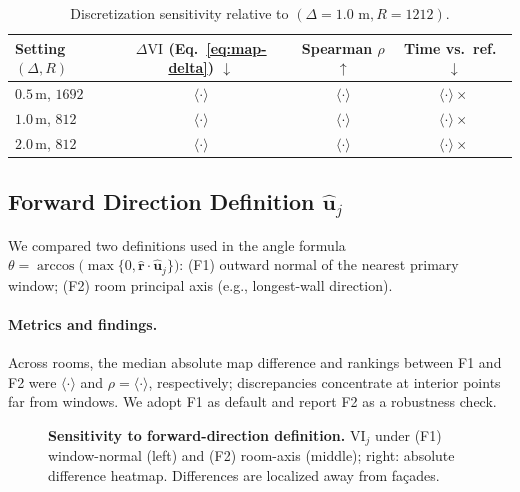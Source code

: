 \documentclass[final,3p,times,review]{elsarticle}
\begin{document}
\begin{table}[H]
\centering
\caption{Discretization sensitivity relative to $(\Delta{=}1.0\text{ m}, R{=}1212)$.}
\label{tab:discretization}
\begin{tabular}{@{}lccc@{}}
\toprule
Setting $(\Delta,R)$ & $\Delta \mathrm{VI}$ (Eq.~\ref{eq:map-delta}) $\downarrow$ & Spearman $\rho$ $\uparrow$ & Time vs.\ ref.\ $\downarrow$ \\
\midrule
$0.5$\,m, $1692$ & $\langle\cdot\rangle$ & $\langle\cdot\rangle$ & $\langle\cdot\rangle\times$ \\
$1.0$\,m, $812$  & $\langle\cdot\rangle$ & $\langle\cdot\rangle$ & $\langle\cdot\rangle\times$ \\
$2.0$\,m, $812$  & $\langle\cdot\rangle$ & $\langle\cdot\rangle$ & $\langle\cdot\rangle\times$ \\
\bottomrule
\end{tabular}
\end{table}

\subsection{Forward Direction Definition $\hat{\mathbf{u}}_j$}
We compared two definitions used in the angle formula $\theta = \arccos\!\big(\max\{0,\hat{\mathbf{r}}\!\cdot\!\hat{\mathbf{u}}_j\}\big)$: (F1) outward normal of the nearest primary window; (F2) room principal axis (e.g., longest-wall direction).

\paragraph{Metrics and findings.}
Across rooms, the median absolute map difference and rankings between F1 and F2 were $\langle\cdot\rangle$ and $\rho{=}\langle\cdot\rangle$, respectively; discrepancies concentrate at interior points far from windows. We adopt F1 as default and report F2 as a robustness check.

\begin{figure}[H]
\centering
\caption{\textbf{Sensitivity to forward-direction definition.} $\mathrm{VI}_j$ under (F1) window-normal (left) and (F2) room-axis (middle); right: absolute difference heatmap. Differences are localized away from façades.}
\label{fig:forward-sensitivity}
\end{figure}
\end{document}
